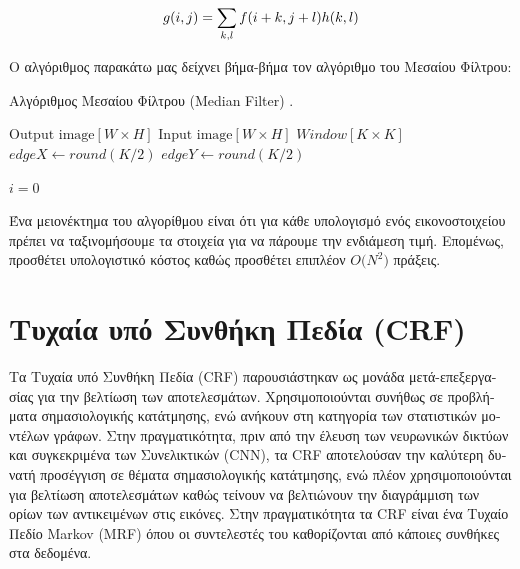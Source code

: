 \begin{equation}
    \centering
    \label{eqn:median_filter}
    g(i,j) = \sum_{k,l} f(i+k,j+l)h(k,l)
\end{equation}

\textgreek{Ο αλγόριθμος παρακάτω μας δείχνει βήμα-βήμα τον αλγόριθμο του Μεσαίου Φίλτρου:}

\begin{algorithm}[H]
    \caption{\textgreek{Αλγόριθμος Μεσαίου Φίλτρου} (Median Filter) \cite{wiki:median}.}
    \label{Algo_median}
  \begin{algorithmic}[2]
    \REQUIRE $\text{Output image} [W \times H]$
    \REQUIRE $\text{Input image} [W \times H]$
    \REQUIRE $Window [K \times K]$
    \REQUIRE $edgeX \gets round(K / 2)$
    \REQUIRE $edgeY \gets round(K / 2)$
    
	\STATE $i=0$
		\STATE {}
		\STATE {}
	    \ENDFOR
	\ENDFOR
	\STATE {}
	\STATE {}
     \ENDFOR
    \ENDFOR
    \RETURN {}

  \end{algorithmic}
\end{algorithm}
\textgreek{Ένα μειονέκτημα του αλγορίθμου είναι ότι για κάθε υπολογισμό ενός εικονοστοιχείου πρέπει να ταξινομήσουμε τα στοιχεία για να πάρουμε την ενδιάμεση τιμή. Επομένως, προσθέτει υπολογιστικό κόστος καθώς προσθέτει επιπλέον $\mathit{Ο(Ν^{2}})$ πράξεις.}

\section{\textgreek{Τυχαία υπό Συνθήκη Πεδία} (CRF)}
\textgreek{Τα Τυχαία υπό Συνθήκη Πεδία }(CRF) \textgreek{παρουσιάστηκαν ως μονάδα μετά-επεξεργασίας για την βελτίωση των αποτελεσμάτων. Χρησιμοποιούνται συνήθως σε προβλήματα σημασιολογικής κατάτμησης, ενώ ανήκουν στη κατηγορία των στατιστικών μοντέλων γράφων. Στην πραγματικότητα, πριν από την έλευση των νευρωνικών δικτύων και συγκεκριμένα των Συνελικτικών} (CNN), \textgreek{τα} CRF \textgreek{αποτελούσαν την καλύτερη δυνατή προσέγγιση σε θέματα σημασιολογικής κατάτμησης, ενώ πλέον χρησιμοποιούνται για βελτίωση αποτελεσμάτων καθώς τείνουν να βελτιώνουν την διαγράμμιση των ορίων των αντικειμένων στις εικόνες. Στην πραγματικότητα τα} CRF \textgreek{είναι ένα Τυχαίο Πεδίο} Markov (MRF) \textgreek{όπου οι συντελεστές του καθορίζονται από κάποιες συνθήκες στα δεδομένα.}


